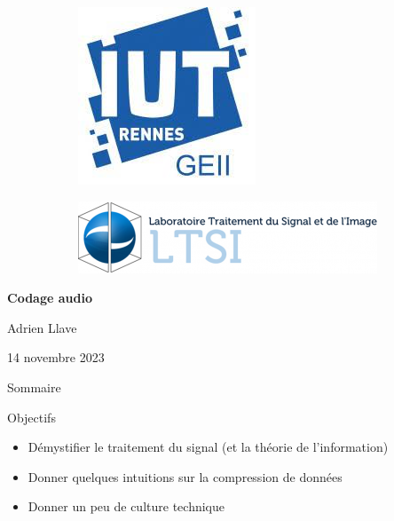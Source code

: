 \documentclass[9pt, aspectratio=169]{beamer}
\begin{document}
\begin{withoutheadline}
\begin{withoutfootline}
\begin{frame}
	\begin{figure}
	\begin{subfigure}{.45\linewidth}
	\begin{flushleft}
		\hspace{-0.5cm}
		\includegraphics[width=0.2\linewidth]{fig/logos/iut.jpg}
	\end{flushleft}
	\end{subfigure}
	\begin{subfigure}{.45\linewidth}
	\begin{flushright}
		\includegraphics[width=0.5\linewidth]{fig/logos/LTSI.png}
	\end{flushright}
	\end{subfigure}
	\end{figure}
	\vspace{0.5cm}
	\textbf{\large Codage audio}

	\vspace{1.4cm}
	\footnotesize Adrien Llave
	\vspace{0.2cm}

	\footnotesize 14 novembre 2023
\end{frame}
\end{withoutfootline}
\end{withoutheadline}

\begin{withoutheadline}
\begin{frame}{Sommaire}
	\tableofcontents[sectionstyle=show,subsectionstyle=show/shaded/hide,subsubsectionstyle=show/shaded/hide]
\end{frame}
\end{withoutheadline}

\begin{frame}{Objectifs} %
\begin{center}

    \begin{itemize}
        \item Démystifier le traitement du signal (et la théorie de l'information)
        \item Donner quelques intuitions sur la compression de données
        \item Donner un peu de culture technique
    \end{itemize}
\end{center}
\end{frame}
\end{document}
